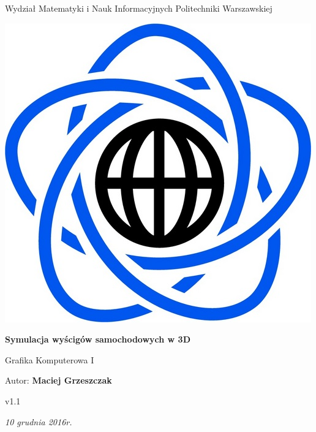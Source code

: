 \documentclass[11pt]{article}
\begin{document}
\begin{titlepage}
\centering

{\large Wydział Matematyki i Nauk Informacyjnych Politechniki Warszawskiej}

\vspace{1cm}
\includegraphics[scale=0.15]{logo}
\vspace{3cm}

{\Huge\bfseries Symulacja wyścigów samochodowych w 3D}

\vspace{0.5cm}

{\Large Grafika Komputerowa I}
\vspace{2cm}

{\Large Autor: \textbf{Maciej Grzeszczak}}

\vspace{1cm}

{\large v1.1}

\vspace{1cm}

\vfill

{\itshape {\large 10 grudnia 2016r.}}
\end{titlepage}

\tableofcontents
\end{document}
